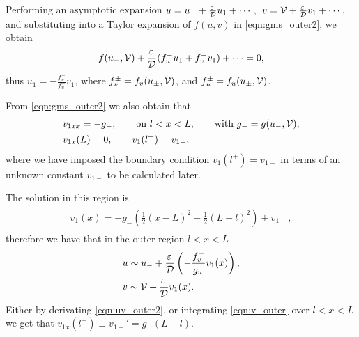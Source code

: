 Performing an asymptotic expansion $u = u_- + \frac{\varepsilon\,}{\mathcal{D}}u_1 + \cdots, \hspace{1ex} v = \mathcal{V} + \frac{\varepsilon\,}{\mathcal{D}}v_1 + \cdots$, and substituting into a Taylor expansion of $f(u,v)$ in \eqref{eqn:gms_outer2}, we obtain
% 
\begin{equation*}
\begin{split}
\begin{aligned}
	&f(u_-,\mathcal{V}) + \frac{\varepsilon\,}{\mathcal{D}}(f_u^-u_1 + f_v^-v_1) + \cdots = 0,\\
\end{aligned}
\end{split}
\end{equation*}
%
thus $u_1 = -\frac{f_v^-}{f_u^-}v_1$, where $f_v^{\pm} = f_v(u_{\pm},\mathcal{V})$, and  $f_u^{\pm} = f_u(u_{\pm},\mathcal{V})$.

From \eqref{eqn:gms_outer2} we also obtain that
% 
\begin{equation}
\label{eqn:v_outer}
\begin{split}
\begin{aligned}
	&v_{1xx} = -g_-,\qquad\text{on }l<x<L,\qquad\text{with }g_- = g(u_-,\mathcal{V}),\\
	&v_{1x}(L) = 0,\qquad v_1(l^+)=v_{1-},
\end{aligned}
\end{split}
\end{equation}
%
where we have imposed the boundary condition $v_1(l^+) = v_{1-}$ in terms of an unknown constant $v_{1-}$ to be calculated later.

The solution in this region is
% 
\begin{equation}
\label{eqn:v1}
\begin{split}
\begin{aligned}
	v_1(x) = -g_-\left(\frac{1}{2}(x-L)^2-\frac{1}{2}(L-l)^2\right) + v_{1-},
\end{aligned}
\end{split}
\end{equation}
%
therefore we have that in the outer region $l<x<L$ 
% 
\begin{equation}
\label{eqn:uv_outer2}
\begin{split}
\begin{aligned}
	&u\sim u_- + \frac{\varepsilon\,}{\mathcal{D}}\left(-\frac{f_v^-}{g_u^-}v_1(x) \right),\\
	&v\sim \mathcal{V} + \frac{\varepsilon\,}{\mathcal{D}}v_1(x).
\end{aligned}
\end{split}
\end{equation}
%
Either by derivating \eqref{eqn:uv_outer2}, or integrating \eqref{eqn:v_outer} over $l<x<L$ we get that $v_{1x}(l^+)\equiv v_{1-}' = g_-(L-l)$.

